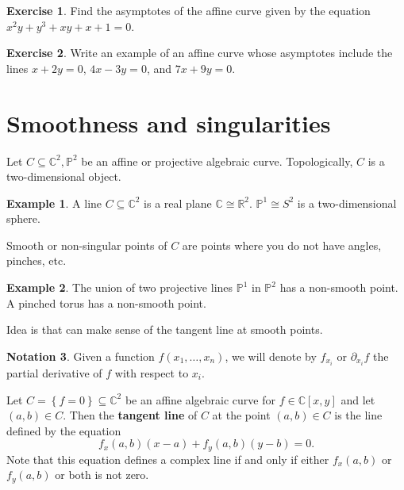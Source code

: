 \documentclass{article}
\newcommand{\R}{\mathbb{R}}
\newcommand{\C}{\mathbb{C}}
\renewcommand{\P}{\mathbb{P}}
\newcommand{\rb}[1]{\left( #1 \right)}
\renewcommand{\sb}[1]{\left[ #1 \right]}
\newcommand{\cb}[1]{\left\{ #1 \right\}}
\theoremstyle{definition}\newtheorem{definition}{Definition}[section]
\theoremstyle{definition}\newtheorem{notation}[definition]{Notation}
\theoremstyle{definition}\newtheorem{remark}[definition]{Remark}
\theoremstyle{definition}\newtheorem{example}[definition]{Example}
\theoremstyle{definition}\newtheorem{fact}{Fact}
\theoremstyle{definition}\newtheorem{exercise}{Exercise}
\begin{document}
\begin{exercise}
Find the asymptotes of the affine curve given by the equation $ x^2y + y^3 + xy + x + 1 = 0 $.
\end{exercise}

\begin{exercise}
Write an example of an affine curve whose asymptotes include the lines $ x + 2y = 0 $, $ 4x - 3y = 0 $, and $ 7x + 9y = 0 $.
\end{exercise}


\section{Smoothness and singularities}

Let $ C \subseteq \C^2, \P^2 $ be an affine or projective algebraic curve. Topologically, $ C $ is a two-dimensional object.

\begin{example}
A line $ C \subseteq \C^2 $ is a real plane $ \C \cong \R^2 $. $ \P^1 \cong S^2 $ is a two-dimensional sphere.
\end{example}

Smooth or non-singular points of $ C $ are points where you do not have angles, pinches, etc.

\begin{example}
The union of two projective lines $ \P^1 $ in $ \P^2 $ has a non-smooth point. A pinched torus has a non-smooth point.
\end{example}

Idea is that can make sense of the tangent line at smooth points.

\begin{notation}
Given a function $ f\rb{x_1, \dots, x_n} $, we will denote by $ f_{x_i} $ or $ \partial_{x_i}f $ the partial derivative of $ f $ with respect to $ x_i $.
\end{notation}

Let $ C = \cb{f = 0} \subseteq \C^2 $ be an affine algebraic curve for $ f \in \C\sb{x, y} $ and let $ \rb{a, b} \in C $. Then the \textbf{tangent line} of $ C $ at the point $ \rb{a, b} \in C $ is the line defined by the equation
$$ f_x\rb{a, b}\rb{x - a} + f_y\rb{a, b}\rb{y - b} = 0. $$
Note that this equation defines a complex line if and only if either $ f_x\rb{a, b} $ or $ f_y\rb{a, b} $ or both is not zero.
\end{document}
